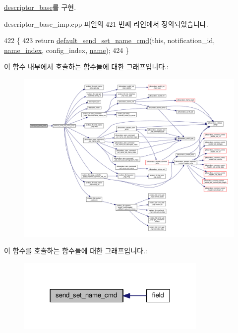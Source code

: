 \hyperlink{classavdecc__lib_1_1descriptor__base_a6a8c227d7a202f251c689107df7ede0b}{descriptor\+\_\+base}를 구현.



descriptor\+\_\+base\+\_\+imp.\+cpp 파일의 421 번째 라인에서 정의되었습니다.


\begin{DoxyCode}
422 \{
423     \textcolor{keywordflow}{return} \hyperlink{classavdecc__lib_1_1descriptor__base__imp_aed899a0eaaaa06a02569135f844ffce8}{default\_send\_set\_name\_cmd}(\textcolor{keyword}{this}, notification\_id, 
      \hyperlink{structjdksavdecc__aem__command__set__name__response_a898a74ada625e0b227dadb02901404e6}{name\_index}, config\_index, \hyperlink{structjdksavdecc__aem__command__set__name__response_a7e615b51b7768e9b59bfa450051e0f8e}{name});
424 \}
\end{DoxyCode}


이 함수 내부에서 호출하는 함수들에 대한 그래프입니다.\+:
\nopagebreak
\begin{figure}[H]
\begin{center}
\leavevmode
\includegraphics[width=350pt]{classavdecc__lib_1_1descriptor__base__imp_af0bb05af3bf67f2ab0eb522096011592_cgraph}
\end{center}
\end{figure}




이 함수를 호출하는 함수들에 대한 그래프입니다.\+:
\nopagebreak
\begin{figure}[H]
\begin{center}
\leavevmode
\includegraphics[width=261pt]{classavdecc__lib_1_1descriptor__base__imp_af0bb05af3bf67f2ab0eb522096011592_icgraph}
\end{center}
\end{figure}




